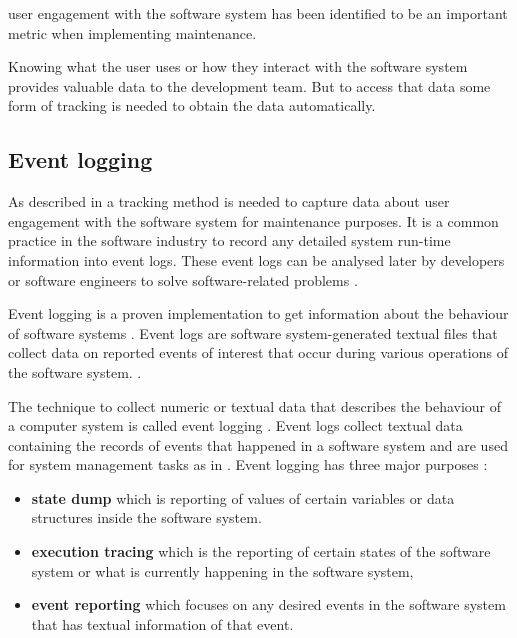  user engagement with the software system has been identified to be an important metric when implementing maintenance.\par Knowing what the user uses or how they interact with the software system provides valuable data to the development team. But to access that data some form of tracking is needed to obtain the data automatically.


\clearpage

\subsection{Event logging}\label{sec:ch1_eventLogging}
As described in  a tracking method is needed to capture data about user engagement with the software system for maintenance purposes. It is a common practice in the software industry to record any detailed system run-time information into event logs. These event logs can be analysed later by developers or software engineers to solve software-related problems \cite{Zhu2019}. \par Event logging is a proven implementation to get information about the behaviour of software systems \cite{Baccanico2014}. Event logs are software system-generated textual files that collect data on reported events of interest that occur during various operations of the software system. \cite{Cinque2013, Baccanico2014}.\par The technique to collect numeric or textual data that describes the behaviour of a computer system is called event logging \cite{Pecchia2015, Baccanico2014}. Event logs collect textual data containing the records of events that happened in a software system and are used for system management tasks as in  \cite{Rong2018a, Rong2018, Baccanico2014}. Event logging has three major purposes \cite{Pecchia2015, Baccanico2014}:

\begin{itemize}
	\item \textbf{state dump} which is reporting of values of certain variables or data structures inside the software system.
	\item \textbf{execution tracing} which is the reporting of certain states of the software system or what is currently happening in the software system,
	\item \textbf{event reporting} which focuses on any desired events in the software system that has textual information of that event.
\end{itemize}

